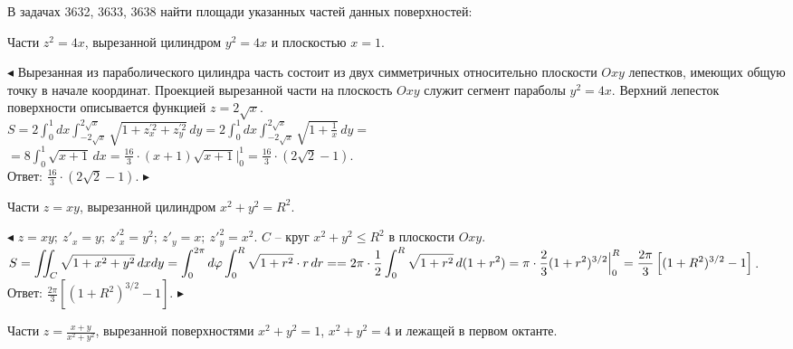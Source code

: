 \documentclass[a5paper,10pt]{article}
\begin{document}
\medskip
\noindent В задачах 3632, 3633, 3638 найти площади указанных частей данных поверхностей:

\medskip
{} Части $z^2=4x$, вырезанной цилиндром $y^2=4x$ и плоскостью $x=1$.

\smallskip
\noindent $\blacktriangleleft$ Вырезанная из параболического цилиндра 
часть состоит из двух симметричных относительно плоскости $Oxy$ 
лепестков, имеющих общую точку в начале координат. Проекцией 
вырезанной части на плоскость $Oxy$ служит сегмент параболы $y^2=4x$. 
Верхний лепесток поверхности описывается функцией $z=2\sqrt x$.\\[3pt]
$\displaystyle S=2\int_{0}^{1}dx\int_{-2\sqrt x}^{2\sqrt x}\sqrt{1+z^{'2}_x+z^{'2}_y}\,dy=
2\int_{0}^{1}dx\int_{-2\sqrt x}^{2\sqrt x}\sqrt{1+\frac 1x}\,dy=$\\[3pt]
$\displaystyle =8\int_{0}^{1}\sqrt{x+1}\,dx=
\frac{16}{3}\cdot(x+1)\sqrt{x+1}\Big|_0^1=
\frac{16}{3}\cdot(2\sqrt 2-1)$.\\[3pt]
Ответ: $\displaystyle \frac{16}{3}\cdot(2\sqrt 2-1)$. 
$\blacktriangleright$

\medskip
{} Части $z=xy$, вырезанной цилиндром $x^2+y^2=R^2$.

\smallskip
\noindent $\blacktriangleleft$ $z=xy;\ z'_x=y;\ z'^2_x=y^2;\ z'_y=x;\ z'^2_y=x^2$. $C$ 
-- круг $x^2+y^2\le R^2$ в плоскости $Oxy$.\\[3pt]
$\displaystyle S=\iint_C\sqrt{1+x^2+y^2}\,dxdy=
\int_0^{2\pi}d\varphi \int_0^R\sqrt{1+r^2}\cdot r\,dr=\\[3pt]
=2\pi\cdot \frac12 \int_0^R\sqrt{1+r^2}\,d(1+r^2)=
\pi \cdot \frac23 (1+r^2)^{3/2}\Big|_0^R=
\frac{2\pi}{3}\left[ (1+R^2)^{3/2}-1\right]$.\\[3pt]
Ответ: $\displaystyle \frac{2\pi}{3}\left[ (1+R^2)^{3/2}-1\right]$. $\blacktriangleright$

\medskip
{} Части $\displaystyle z=\frac{x+y}{x^2+y^2}$, вырезанной поверхностями $x^2+y^2=1$, $x^2+y^2=4$ и лежащей в первом октанте.
\end{document}
